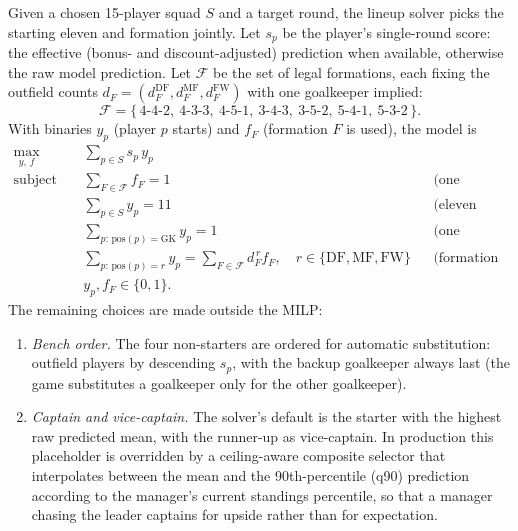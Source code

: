 Given a chosen 15-player squad $S$ and a target round, the lineup
solver picks the starting eleven and formation jointly. Let $s_p$ be
the player's single-round score: the effective (bonus- and
discount-adjusted) prediction when available, otherwise the raw model
prediction.
Let $\mathcal{F}$ be the set of legal formations, each fixing the
outfield counts $d_{F} = (d_F^{\mathrm{DF}}, d_F^{\mathrm{MF}},
d_F^{\mathrm{FW}})$ with one goalkeeper implied:
\[
\mathcal{F} = \{\,\text{4-4-2},\ \text{4-3-3},\ \text{4-5-1},\
\text{3-4-3},\ \text{3-5-2},\ \text{5-4-1},\ \text{5-3-2}\,\}.
\]
With binaries $y_p$ (player $p$ starts) and $f_F$ (formation $F$ is
used), the model is
\begin{align}
\max_{y,\, f} \quad & \sum_{p \in S} s_p \, y_p \\
\text{subject to} \quad
& \sum_{F \in \mathcal{F}} f_F = 1
  && \text{(one formation)} \\
& \sum_{p \in S} y_p = 11
  && \text{(eleven starters)} \\
& \sum_{p :\, \mathrm{pos}(p) = \mathrm{GK}} y_p = 1
  && \text{(one goalkeeper)} \\
& \sum_{p :\, \mathrm{pos}(p) = r} y_p
  = \sum_{F \in \mathcal{F}} d_F^{\,r} f_F,
  \quad r \in \{\mathrm{DF}, \mathrm{MF}, \mathrm{FW}\}
  && \text{(formation counts)} \\
& y_p, f_F \in \{0, 1\}. \nonumber
\end{align}
The remaining choices are made outside the MILP:
\begin{enumerate}
\item \emph{Bench order.} The four non-starters are ordered for
  automatic substitution: outfield players by descending $s_p$, with
  the backup goalkeeper always last (the game substitutes a
  goalkeeper only for the other goalkeeper).
\item \emph{Captain and vice-captain.} The solver's default is the
  starter with the highest raw predicted mean, with the runner-up as
  vice-captain. In production this placeholder is overridden by a
  ceiling-aware composite selector that interpolates between the mean
  and the 90th-percentile (q90) prediction according to the manager's
  current standings percentile, so that a manager chasing the leader
  captains for upside rather than for expectation.
\end{enumerate}

